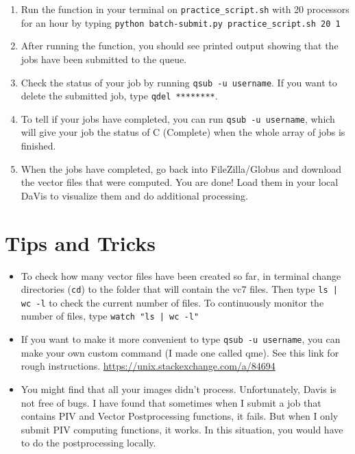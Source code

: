 \documentclass{article}
\begin{document}
\begin{enumerate}
    	\item Run the function in your terminal on \texttt{practice\_script.sh} with 20 processors for an hour by typing \texttt{python batch-submit.py practice\_script.sh 20 1}
    	
    	\item After running the function, you should see printed output showing that the jobs have been submitted to the queue.
    	
    	\item Check the status of your job by running \texttt{qsub -u username}.  If you want to delete the submitted job, type \texttt{qdel ********}.
    	
    	\item To tell if your jobs have completed, you can run \texttt{qsub -u username}, which will give your job the status of C (Complete) when the whole array of jobs is finished.  
    	
    	\item When the jobs have completed, go back into FileZilla/Globus and download the vector files that were computed.  You are done!  Load them in your local DaVis to visualize them and do additional processing.
	\end{enumerate}
    
    \section{Tips and Tricks}
    \begin{itemize}
        \item To check how many vector files have been created so far, in terminal change directories (\texttt{cd}) to the folder that will contain the vc7 files.  Then type \texttt{ls | wc -l} to check the current number of files.  To continuously monitor the number of files, type \texttt{watch "ls | wc -l"}
        
        \item If you want to make it more convenient to type \texttt{qsub -u username}, you can make your own custom command (I made one called qme).  See this link for rough instructions. \url{https://unix.stackexchange.com/a/84694}
        
        \item You might find that all your images didn't process.  Unfortunately, Davis is not free of bugs.  I have found that sometimes when I submit a job that contains PIV and Vector Postprocessing functions, it fails.  But when I only submit PIV computing functions, it works.  In this situation, you would have to do the postprocessing locally.
        
    \end{itemize}
    
\end{document}
